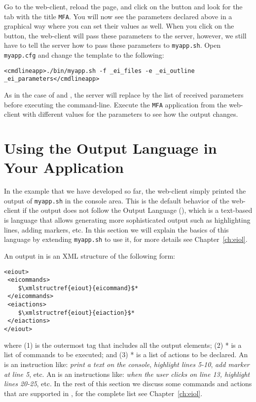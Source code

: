 Go to the web-client, reload the page, and click on the \settingbutton
button and look for the tab with the title \texttt{MFA}.  You will now
see the parameters declared above in a graphical way where you can set
their values as well.  When you click on the \applybutton button, the
web-client will pass these parameters to the server, however, we still
have to tell the server how to pass these parameters to
\texttt{myapp.sh}. Open \texttt{myapp.cfg} and change the
 template to the following:

\medskip
\begin{lstlisting}
<cmdlineapp>./bin/myapp.sh -f _ei_files -e _ei_outline _ei_parameters</cmdlineapp>
\end{lstlisting}

\medskip
\noindent
As in the case of  and , the server
will replace  by the list of received parameters before
executing the command-line. Execute the \texttt{MFA} application from
the web-client with different values for the parameters to see how the
output changes.

\section{Using the \ei Output Language in Your Application}

In the example that we have developed so far, the web-client simply
printed the output of \texttt{myapp.sh} in the console area. This is
the default behavior of the web-client if the output does not follow
the \ei Output Language (\eiol), which is a text-based is language
that allows generating more sophisticated output such as highlighting
lines, adding markers, etc.
%
In this section we will explain the basics of this language by
extending \texttt{myapp.sh} to use it, for more details see
Chapter~\ref{ch:eiol}.

An output in \eiol is an XML structure of the following form:

\medskip
\noindent
\begin{lstlisting}
<eiout> 
 <eicommands>
    $\xmlstructref{eiout}{eicommand}$*
 </eicommands>
 <eiactions>
    $\xmlstructref{eiout}{eiaction}$*
 </eiactions>
</eiout>
\end{lstlisting}

\medskip
\noindent
where (1)  is the outermost tag that includes all the
output elements; (2) * is a list of commands
to be executed; and (3) * is a list of actions
to be declared.
%
An  is an instruction like: \emph{print a text
  on the console}, \emph{highlight lines 5-10}, \emph{add marker at
  line 5}, etc.
%
An  is an instructions like: \emph{when the
  user clicks on line 13, highlight lines 20-25}, etc.
%
In the rest of this section we discuss some commands and actions that
are supported in \eiol, for the complete list see
Chapter~\ref{ch:eiol}.

